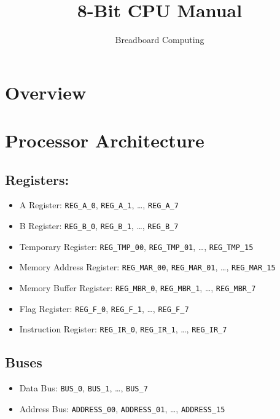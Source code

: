 \documentclass[a4paper]{article}
\title{8-Bit CPU Manual}
\author{Breadboard Computing}
\date{}
\begin{document}
\maketitle


\pagebreak

\tableofcontents

\pagebreak

\section{Overview}

\pagebreak

\section{Processor Architecture}

\subsection{Registers:}
\begin{itemize}
    \item A Register: \texttt{REG\_A\_0}, \texttt{REG\_A\_1}, \dots, \texttt{REG\_A\_7}
    \item B Register: \texttt{REG\_B\_0}, \texttt{REG\_B\_1}, \dots, \texttt{REG\_B\_7}
    \item Temporary Register: \texttt{REG\_TMP\_00}, \texttt{REG\_TMP\_01}, \dots, \texttt{REG\_TMP\_15}
    \item Memory Address Register: \texttt{REG\_MAR\_00}, \texttt{REG\_MAR\_01}, \dots, \texttt{REG\_MAR\_15}
    \item Memory Buffer Register: \texttt{REG\_MBR\_0}, \texttt{REG\_MBR\_1}, \dots, \texttt{REG\_MBR\_7}
    \item Flag Register:  \texttt{REG\_F\_0}, \texttt{REG\_F\_1}, \dots, \texttt{REG\_F\_7}
    \item Instruction Register: \texttt{REG\_IR\_0}, \texttt{REG\_IR\_1}, \dots, \texttt{REG\_IR\_7}
\end{itemize}

\subsection{Buses}
\begin{itemize}
    \item Data Bus: \texttt{BUS\_0}, \texttt{BUS\_1}, \dots, \texttt{BUS\_7}
    \item Address Bus: \texttt{ADDRESS\_00}, \texttt{ADDRESS\_01}, \dots, \texttt{ADDRESS\_15}
\end{itemize}
\end{document}
